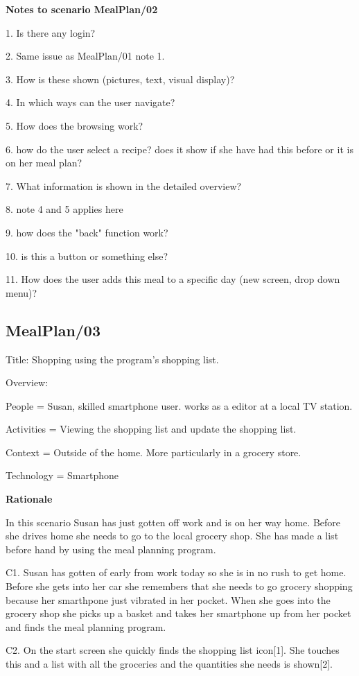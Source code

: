 \textbf{Notes to scenario MealPlan/02}

1. Is there any login?

2. Same issue as MealPlan/01 note 1.

3. How is these shown (pictures, text, visual display)?

4. In which ways can the user navigate?

5. How does the browsing work?

6. how do the user select a recipe? does it show if she have had this before or it is on her meal 
plan?

7. What information is shown in the detailed overview?

8. note 4 and 5 applies here

9. how does the "back" function work?

10. is this a button or something else?

11. How does the user adds this meal to a specific day (new screen, drop down menu)?

\subsection{MealPlan/03} \label{MealPlan03}

Title: Shopping using the program's shopping list.

Overview:

	People = Susan, skilled smartphone user. works as a editor at a local TV station. 
	
	Activities = Viewing the shopping list and update the shopping list.

	Context = Outside of the home. More particularly in a grocery store.

	Technology = Smartphone
	
\textbf{Rationale}

In this scenario Susan has just gotten off work and is on her way home. Before she drives home she needs to go to the local grocery shop. She has made a list before hand by using the meal planning program.

	C1. Susan has gotten of early from work today so she is in no rush to get home. Before she gets into her car she remembers that she needs to go grocery shopping because her smarthpone just vibrated in her pocket. When she goes into the grocery shop she picks up a basket and takes her smartphone up from her pocket and finds the meal planning program.
	
	C2. On the start screen she quickly finds the shopping list icon[1]. She touches this and a list with all the groceries and the quantities she needs is shown[2].
	
